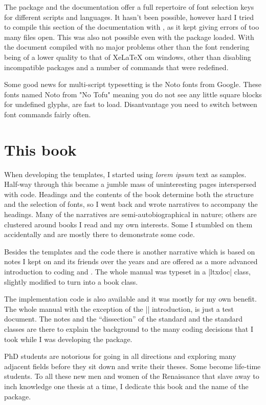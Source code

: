 The package and the documentation offer a full repertoire of font selection keys for different scripts and languages. It hasn't been possible, however hard I tried to compile this section of the documentation with \xelatex, as it kept giving errors of too many files open. This was also not possible even with the  package loaded. With \lualatex the document compiled with no major problems other than the font rendering being of a lower quality to that of XeLaTeX om windows, other than disabling incompatible packages and a number of commands that were redefined. 

Some good news for multi-script typesetting is the Noto fonts from Google. These fonts named Noto from "No Tofu" meaning you do not see any little square blocks for undefined glyphs, are fast to load. Disantvantage you need to switch between font commands fairly often.

\section{This book}

When developing the templates, I started using \emph{lorem ipsum} text as samples. Half-way through this
became a jumble mass of uninteresting pages interspersed with code. Headings and the contents of the book
determine both the structure and the selection of fonts, so I went back and wrote narratives  to accompany
the headings. Many of the narratives are semi-autobiographical in nature; others are clustered around books I read and my own interests. Some I stumbled on them accidentally and are mostly there to demonstrate some code.

Besides the templates and the code there is another narrative which is based on notes I kept on \tex and its friends over the years and are offered as a more advanced introduction to coding \latexe and \tex. The whole manual was typeset in a |ltxdoc| class, slightly modified to turn into a book class.

The implementation code is also available and it was mostly for my own benefit. The whole manual with the exception of the |\cxset| introduction, is just a test document. The notes and the “dissection” of the standard \latexe and the standard classes are there to explain the background to the many coding decisions that I took while I was developing the package.

PhD students are notorious for going in all directions and exploring many adjacent fields before they sit down and write their theses. Some become life-time students. To all these new men and women of the Renaissance that slave away to inch knowledge one thesis at a time, I dedicate this book and the name of the package.

